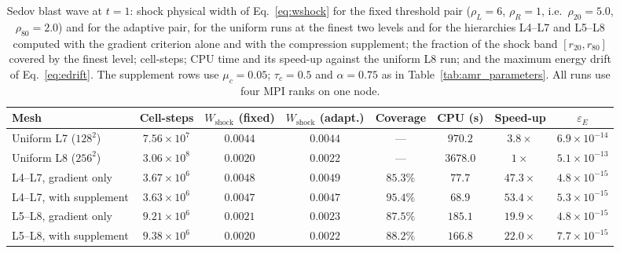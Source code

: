 \documentclass[a4paper]{cas-sc}
\begin{document}
\begin{table}[pos=htbp]
	\centering
	\caption{Sedov blast wave at $t=1$: shock physical width of
	Eq.~\eqref{eq:wshock} for the fixed threshold pair ($\rho_L=6$, $\rho_R=1$,
	i.e.\ $\rho_{20}=5.0$, $\rho_{80}=2.0$) and for the adaptive pair, for the
	uniform runs at the finest two levels and for the hierarchies L4--L7 and
	L5--L8 computed with the gradient criterion alone and with the compression
	supplement; the fraction of the shock band $[r_{20},r_{80}]$ covered by the
	finest level; cell-steps; CPU time and its speed-up against the uniform L8
	run; and the maximum energy drift of Eq.~\eqref{eq:edrift}. The supplement
	rows use $\mu_c=0.05$; $\tau_c=0.5$ and $\alpha=0.75$ as in
	Table~\ref{tab:amr_parameters}. All runs use
	four MPI ranks on one node.}
	\label{tab:sedov_compression}
	\begin{tabular}{lccccccc}
		\hline
		Mesh & Cell-steps & $W_{\mathrm{shock}}$ (fixed) & $W_{\mathrm{shock}}$ (adapt.) & Coverage & CPU (s) & Speed-up & $\varepsilon_E$ \\
		\hline
		Uniform L7 ($128^2$)    & $7.56\times10^{7}$ & $0.0044$ & $0.0044$ & ---      & $970.2$  & $3.8\times$  & $6.9\times10^{-14}$ \\
		Uniform L8 ($256^2$)    & $3.06\times10^{8}$ & $0.0020$ & $0.0022$ & ---      & $3678.0$ & $1\times$    & $5.1\times10^{-13}$ \\
		L4--L7, gradient only   & $3.67\times10^{6}$ & $0.0048$ & $0.0049$ & $85.3\%$ & $77.7$   & $47.3\times$ & $4.8\times10^{-15}$ \\
		L4--L7, with supplement & $3.63\times10^{6}$ & $0.0047$ & $0.0047$ & $95.4\%$ & $68.9$   & $53.4\times$ & $5.3\times10^{-15}$ \\
		L5--L8, gradient only   & $9.21\times10^{6}$ & $0.0021$ & $0.0023$ & $87.5\%$ & $185.1$  & $19.9\times$ & $4.8\times10^{-15}$ \\
		L5--L8, with supplement & $9.38\times10^{6}$ & $0.0020$ & $0.0022$ & $88.2\%$ & $166.8$  & $22.0\times$ & $7.7\times10^{-15}$ \\
		\hline
	\end{tabular}
\end{table}
\end{document}
